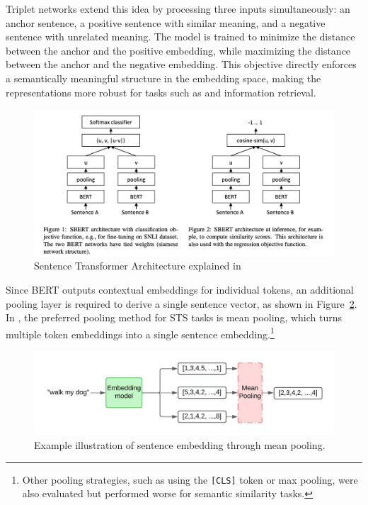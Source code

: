 Triplet networks extend this idea by processing three inputs simultaneously: an anchor sentence, a positive sentence with similar meaning, and a negative sentence with unrelated meaning. The model is trained to minimize the distance between the anchor and the positive embedding, while maximizing the distance between the anchor and the negative embedding. This objective directly enforces a semantically meaningful structure in the embedding space, making the representations more robust for tasks such as  and information retrieval.
\begin{figure}[h!]
    \centering
    \includegraphics[width=1\linewidth]{Images/sentence_transformer.png}
    \caption{Sentence Transformer Architecture explained in~\cite{reimers2019sentencebertsentenceembeddingsusing}}
    \label{fig:sentence-transformer-architecture}
\end{figure}
Since \gls{BERT} outputs contextual embeddings for individual tokens, an additional pooling layer is required to derive a single sentence vector, as shown in Figure~\ref{fig:Sentence_embedding}. In \cite{reimers2019sentencebertsentenceembeddingsusing}, the preferred pooling method for \gls{STS} tasks is mean pooling, which turns multiple token embeddings into a single sentence embedding.\footnote{Other pooling strategies, such as using the \texttt{[CLS]} token or max pooling, were also evaluated but performed worse for semantic similarity tasks.}

\begin{figure}[h!]
    \centering
    \includegraphics[width=1\linewidth]{Figures/Sentence_Embedding.jpeg}
    \caption{Example illustration of sentence embedding through mean pooling.}\label{fig:Sentence_embedding}
\end{figure}

